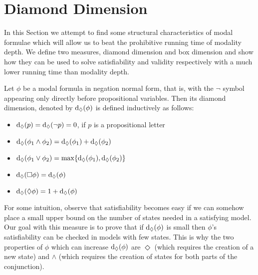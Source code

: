\documentclass{llncs}
\newcommand{\dd}{\ensuremath \textrm{dd}}
\begin{document}
\renewcommand{\dd}{\ensuremath \mathrm{d}_\Diamond}
\newcommand{\bd}{\ensuremath \mathrm{d}_\Box}

\section{Diamond Dimension} \label{sec:dimension}

In this Section we attempt to find some structural characteristics
of modal formulae which will allow us to beat the prohibitive
running time of modality depth. We define two measures, diamond
dimension and box dimension and show how they can be used to solve
satisfiability and validity respectively with a much lower running
time than modality depth.

\begin{definition}

Let $\phi$ be a modal formula in negation normal form, that is, with the $\neg$
symbol appearing only directly before propositional variables. Then its diamond
dimension, denoted by $\dd(\phi)$ is defined inductively as follows:

\begin{itemize}

\item $\dd(p)= \dd(\neg p) = 0$, if $p$ is a propositional letter

\item $\dd(\phi_1 \land \phi_2) = \dd(\phi_1) + \dd(\phi_2)$

\item $\dd(\phi_1 \lor \phi_2) = \max\{\dd(\phi_1),\dd(\phi_2) \}$

\item $\dd(\Box \phi) = \dd(\phi)$

\item $\dd(\Diamond \phi) = 1 + \dd(\phi)$

\end{itemize}

\end{definition}



For some intuition, observe that satisfiability becomes easy if we can somehow
place a small upper bound on the number of states needed in a satisfying model.
Our goal with this measure is to prove that if $\dd(\phi)$ is small then
$\phi$'s satisfiability can be checked in models with few states. This is why
the two properties of $\phi$ which can increase $\dd(\phi)$ are $\Diamond$
(which requires the creation of a new state) and $\land$ (which requires the
creation of states for both parts of the conjunction).
\end{document}
